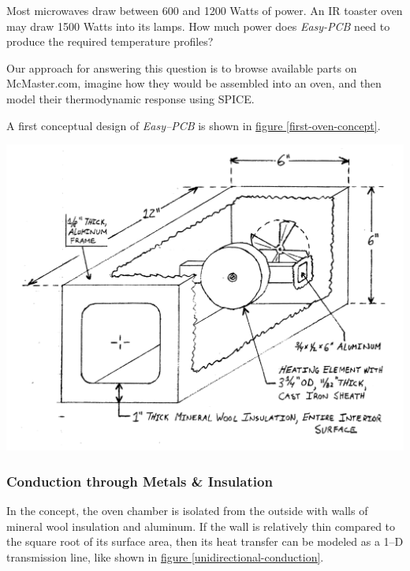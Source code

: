 \documentclass[10pt, twocolumn]{article}
\begin{document}
Most microwaves draw between 600 and 1200 Watts of power.
An IR toaster oven may draw 1500 Watts into its lamps.
How much power does \emph{Easy-PCB} need to produce the required temperature profiles?

Our approach for answering this question is to browse available parts on McMaster.com,
imagine how they would be assembled into an oven,
and then model their thermodynamic response using SPICE.

A first conceptual design of \emph{Easy--PCB} is shown in
\hyperref[first-oven-concept]{figure \ref{first-oven-concept}}.

\begin{center}
	\includegraphics[width=\columnwidth]{Figures/first-oven-concept.pdf}
	\label{first-oven-concept}
\end{center}

\subsubsection*{Conduction through Metals \& Insulation}
In the concept, the oven chamber is isolated from the outside with walls of
mineral wool insulation and aluminum.
If the wall is relatively thin compared to the square root of its surface area,
then its heat transfer can be modeled as a 1--D transmission line, like shown in
\hyperref[unidirectional-conduction]{figure \ref{unidirectional-conduction}}.
\end{document}
